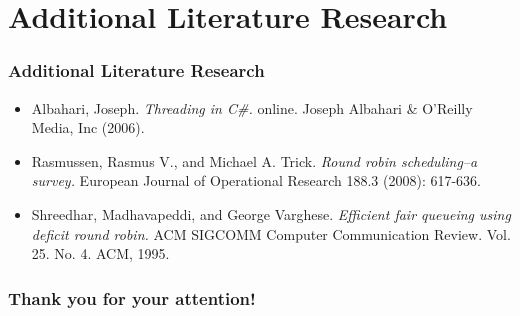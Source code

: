 \documentclass{beamer}
\begin{document}
\section{Additional Literature Research}
    \begin{frame}
        \frametitle{Additional Literature Research}
        \begin{itemize}
            \item Albahari, Joseph. \emph{Threading in C\#.} online. Joseph Albahari \& O’Reilly Media, Inc (2006).
            \item Rasmussen, Rasmus V., and Michael A. Trick. \emph{Round robin scheduling–a survey.} European Journal of Operational Research 188.3 (2008): 617-636.
            \item Shreedhar, Madhavapeddi, and George Varghese. \emph{Efficient fair queueing using deficit round robin.} ACM SIGCOMM Computer Communication Review. Vol. 25. No. 4. ACM, 1995.
        \end{itemize}
    \end{frame}

    \begin{frame}
        \frametitle{Thank you for your attention!}
    \end{frame}
\end{document}
